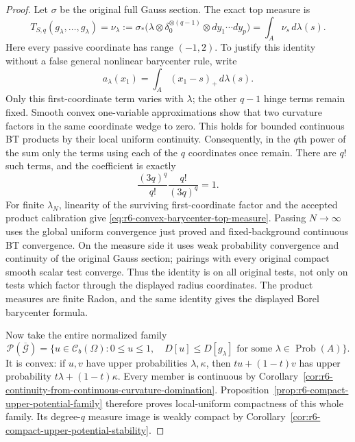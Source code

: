 \documentclass[11pt,a4paper]{article}
\numberwithin{equation}{section}
\theoremstyle{definition}
\theoremstyle{remark}
\begin{document}
\begin{proof}
Let $\sigma$ be the original full Gauss section. The exact top
measure is
\begin{equation}
 T_{S,q}(g_\lambda,\ldots,g_\lambda)
   =\nu_\lambda
   :=\sigma_*\bigl(\lambda\otimes\delta_0^{\otimes(q-1)}
                                      \otimes dy_1\cdots dy_p\bigr)
   =\int_A\nu_s\,d\lambda(s).
 \label{eq:r6-convex-barycenter-top-measure}
\end{equation}
Here every passive coordinate has range $(-1,2)$. To justify this
identity without a false general nonlinear barycenter rule, write
\[
 a_\lambda(x_1)=\int_A(x_1-s)_+\,d\lambda(s).
\]
Only this first-coordinate term varies with $\lambda$; the other
$q-1$ hinge terms remain fixed. Smooth convex one-variable
approximations show that two curvature factors in the same
coordinate wedge to zero. This holds for bounded continuous BT
products by their local uniform continuity. Consequently, in the
$q$th power of the sum only the terms using each of the $q$
coordinates once remain. There are $q!$ such terms, and the
coefficient is exactly
\[
                     \frac{(3q)^q}{q!}\frac{q!}{(3q)^q}=1.
\]
For finite $\lambda_N$, linearity of the surviving first-coordinate
factor and the accepted product calibration give
\eqref{eq:r6-convex-barycenter-top-measure}. Passing $N\to\infty$
uses the global uniform convergence just proved and fixed-background
continuous BT convergence. On the measure side it uses weak
probability convergence and continuity of the original Gauss section;
pairings with every original compact smooth scalar test converge.
Thus the identity is on all original tests, not only on tests which
factor through the displayed radius coordinates. The product measures
are finite Radon, and the same identity gives the displayed Borel
barycenter formula.

Now take the entire normalized family
\[
 \mathscr P(\overline{\mathscr G})=
 \{u\in\mathcal C_b(\Omega):0\le u\le1,
               \quad D[u]\le D[g_\lambda]
                         \text{ for some }\lambda\in\operatorname{Prob}(A)\}.
\]
It is convex: if $u,v$ have upper probabilities $\lambda,\kappa$,
then $tu+(1-t)v$ has upper probability $t\lambda+(1-t)\kappa$.
Every member is continuous by
Corollary~\ref{cor:r6-continuity-from-continuous-curvature-domination}.
Proposition~\ref{prop:r6-compact-upper-potential-family} therefore
proves local-uniform compactness of this whole family. Its degree-$q$
measure image is weakly compact by
Corollary~\ref{cor:r6-compact-upper-potential-stability}.


\end{proof}
\end{document}
